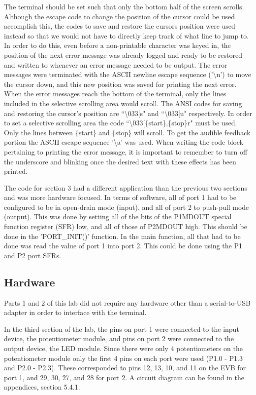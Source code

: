 \documentclass[12pt]{article}
\begin{document}
The terminal should be set such that only the bottom half of the screen scrolls. Although the escape code to change the position of the cursor could be used accomplish this, the codes to save and restore the cursors position were used instead so that we would not have to directly keep track of what line to jump to. In order to do this, even before a non-printable character was keyed in, the position of the next error message was already logged and ready to be restored and written to whenever an error message needed to be output. The error messages were terminated with the ASCII newline escape sequence ('\textbackslash n') to move the cursor down, and this new position was saved for printing the next error. When the error messages reach the bottom of the terminal, only the lines included in the selective scrolling area would scroll. The ANSI codes for saving and restoring the cursor's position are ``\textbackslash033[s" and ``\textbackslash033[u" respectively. In order to set a selective scrolling area the code ``\textbackslash033[\{start\},\{stop\}r" must be used. Only the lines between \{start\} and \{stop\} will scroll. To get the audible feedback portion the ASCII escape sequence '\textbackslash a' was used. When writing the code block pertaining to printing the error message, it is important to remember to turn off the underscore and blinking once the desired text with these effects has been printed.

The code for section 3 had a different application than the previous two sections and was more hardware focused. In terms of software, all of port 1 had to be configured to be in open-drain mode (input), and all of port 2 to push-pull mode (output). This was done by setting all of the bits of the P1MDOUT special function register (SFR) low, and all of those of P2MDOUT high. This should be done in the 'PORT\_INIT()' function. In the main function, all that had to be done was read the value of port 1 into port 2. This could be done using the P1 and P2 port SFRs. 

\subsection{Hardware}

Parts 1 and 2 of this lab did not require any hardware other than a serial-to-USB adapter in order to interface with the terminal.

In the third section of the lab, the pins on port 1 were connected to the input device, the potentiometer module, and pins on port 2 were connected to the output device, the LED module. Since there were only 4 potentiometers on the potentiometer module only the first 4 pins on each port were used (P1.0 - P1.3 and P2.0 - P2.3). These corresponded to pins 12, 13, 10, and 11 on the EVB for port 1, and 29, 30, 27, and 28 for port 2. A circuit diagram can be found in the appendices, section 5.4.1.
\end{document}
